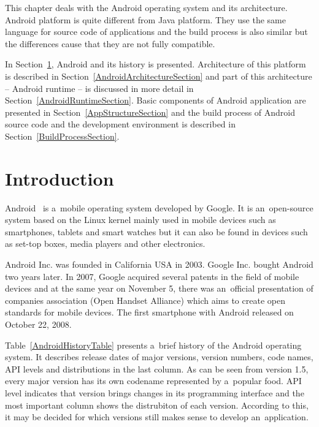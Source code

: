 This chapter deals with the Android operating system and its architecture. Android platform is quite different from
Java platform. They use the same language for source code of applications and the build process is also similar but the
differences cause that they are not fully compatible.

In Section~\ref{AndroidIntroductionSection}, Android and its history is presented. Architecture of this platform is
described in Section~\ref{AndroidArchitectureSection} and part of this architecture -- Android runtime -- is discussed
in more detail in Section~\ref{AndroidRuntimeSection}. Basic components of Android application are presented in
Section~\ref{AppStructureSection} and the build process of Android source code and the development environment is
described in Section~\ref{BuildProcessSection}.

\section{Introduction}\label{AndroidIntroductionSection}
Android~\cite{AndroidBook, AndroidProgBook} is a~mobile operating system developed by Google. It is an~open-source
system based on the Linux kernel mainly used in mobile devices such as smartphones, tablets and smart watches but it can
also be found in devices such as set-top boxes, media players and other electronics.

Android Inc. was founded in California USA in 2003. Google Inc. bought Android two years later. In 2007, Google acquired
several patents in the field of mobile devices and at the same year on November 5, there was an~official presentation
of companies association (Open Handset Alliance) which aims to create open standards for mobile devices. The first
smartphone with Android released on October 22, 2008.

Table~\ref{AndroidHistoryTable} presents a~brief history of the Android operating system. It describes release dates of
major versions, version numbers, code names, API levels and distributions in the last column. As can be seen from
version 1.5, every major version has its own codename represented by a~popular food. API level indicates that version
brings changes in its programming interface and the most important column shows the distrubiton of each version.
According to this, it may be decided for which versions still makes sense to develop an~application.

